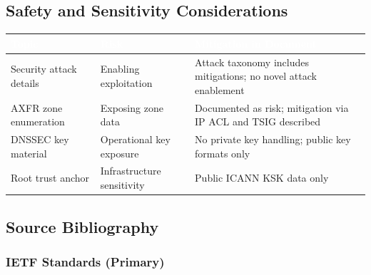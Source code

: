 \documentclass[11pt,letterpaper]{article}
\newcommand{\tableheader}[1]{\textbf{\sffamily\textcolor{white}{#1}}}
\begin{document}
\subsection{Safety and Sensitivity Considerations}

\begin{center}
\begin{tabularx}{\textwidth}{L{3cm}L{3cm}X}
\toprule
{}
\tableheader{Topic} & \tableheader{Risk} & \tableheader{Mitigation in Document} \\
\midrule
Security attack details & Enabling exploitation & Attack taxonomy includes mitigations; no novel attack enablement \\
AXFR zone enumeration & Exposing zone data & Documented as risk; mitigation via IP ACL and TSIG described \\
DNSSEC key material & Operational key exposure & No private key handling; public key formats only \\
Root trust anchor & Infrastructure sensitivity & Public ICANN KSK data only \\
\bottomrule
\end{tabularx}
\end{center}

\subsection{Source Bibliography}

\subsubsection{IETF Standards (Primary)}
\end{document}
